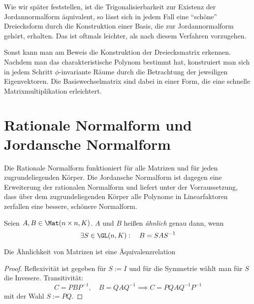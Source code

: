 \documentclass{mycourse}
\begin{document}
\begin{note}
Wie wir später feststellen, ist die Trigonalisierbarkeit zur Existenz der Jordannormalform äquivalent, so lässt sich in jedem Fall eine "`schöne"' Dreiecksform durch die Konstruktion einer Basis, die zur Jordannormalform gehört, erhalten.
Das ist oftmals leichter, als nach diesem Verfahren vorzugehen.

Sonst kann man am Beweis die Konstruktion der Dreiecksmatrix erkennen. Nachdem man das charakteristische Polynom bestimmt hat, konstruiert man sich in jedem Schritt $\phi$-invariante Räume durch die Betrachtung der jeweiligen Eigenvektoren.  Die Basiswechselmatrix sind dabei in einer Form, die eine schnelle Matrixmultiplikation erleichtert.
\end{note}



\chapter{Rationale Normalform und Jordansche Normalform}

Die Rationale Normalform funktioniert für alle Matrizen und für jeden zugrundeliegenden Körper.
Die Jordansche Normalform ist dagegen eine Erweiterung der rationalen Normalform und liefert unter der Vorraussetzung, dass über dem zugrundeliegenden Körper alle Polynome in Linearfaktoren zerfallen eine bessere, schönere Normalform.

\begin{df}
\label{df:12.1}
Seien $A,B\in \Mat(n\times n,K)$.
$A$ und $B$ heißen \emph{ähnlich} genau dann, wenn
\[
\exists S\in \GL(n,K):\quad B=SAS^{-1}
\]
\begin{note}
	Die Ähnlichkeit von Matrizen ist eine Äquivalenzrelation
	\begin{proof}
		Reflexivität ist gegeben für $S:=I$ und für die Symmetrie wählt man für $S$ die Invesere.
		Transitivität:
		\[
			C = PBP^{-1}, \quad B= QAQ^{-1} \implies C = PQAQ^{-1}P^{-1}
		\]
		mit der Wahl $S:= PQ$.
	\end{proof}
\end{note}
\end{df}
\end{document}
